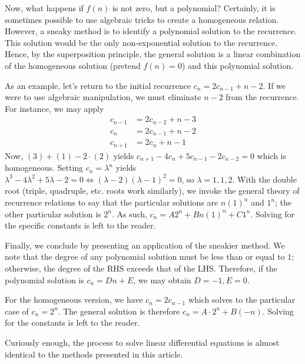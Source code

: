 \documentclass{article}
\begin{document}
Now, what happens if $f(n)$ is not zero, but a polynomial? Certainly, it is sometimes possible to use algebraic tricks to create a homogeneous relation. However, a sneaky method is to identify a polynomial solution to the recurrence. This solution would be the only non-exponential solution to the recurrence. Hence, by the superposition principle, the general solution is a linear combination of the homogeneous solution (pretend $f(n) = 0$) and this polynomial solution.

As an example, let's return to the initial recurrence $c_n = 2c_{n-1} + n-2.$ If we were to use algebraic manipulation, we must eliminate $n-2$ from the recurrence. For instance, we may apply 
\begin{align}
    c_{n-1} &= 2c_{n-2} + n-3 \\
    c_{n} &= 2c_{n-1} + n-2 \\
    c_{n+1} &= 2c_{n} + n-1 
\end{align}
Now, $(3) + (1) - 2 \cdot (2)$ yields $c_{n+1}-4c_{n}+5c_{n-1}-2c_{n-2} = 0$ which is homogeneous. Setting $c_n = \lambda^n$ yields $\lambda^3 - 4\lambda^2 + 5\lambda -2 = 0 \Longleftrightarrow (\lambda - 2)(\lambda-1)^2 = 0$, so $\lambda = 1,1,2$. With the double root (triple, quadruple, etc. roots work similarly), we invoke the general theory of recurrence relations to say that the particular solutions are $n(1)^n$ and $1^n$; the other particular solution is $2^n.$ As such, $c_n = A2^n + Bn(1)^n + C1^n$. Solving for the specific constants is left to the reader. 

Finally, we conclude by presenting an application of the sneakier method. We note that the degree of any polynomial solution must be less than or equal to $1$; otherwise, the degree of the RHS exceeds that of the LHS. Therefore, if the polynomial solution is $c_n = Dn + E$, we may obtain $D = -1, E = 0.$ 

For the homogeneous version, we have $c_n = 2c_{n-1}$ which solves to the particular case of $c_n = 2^n$. The general solution is therefore $c_n = A\cdot 2^n + B(-n).$ Solving for the constants is left to the reader.

Curiously enough, the process to solve linear differential equations is almost identical to the methods presented in this article. 
\end{document}
